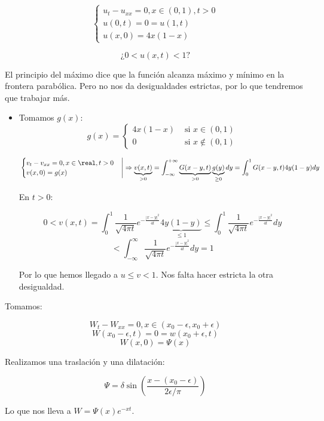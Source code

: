 \begin{problem}[12]

	\[\begin{cases}
		u_t - u_{xx} = 0, x \in (0,1), t > 0\\
		u(0,t) = 0 = u(1,t)\\
		u(x,0) = 4x(1-x)
	\end{cases}\]

	\[\text{¿} 0 < u(x,t) < 1 \text{?}\]

\solution

	El principio del máximo dice que la función alcanza máximo y mínimo en la frontera parabólica. Pero no nos da desigualdades estrictas, por lo que tendremos que trabajar más.

	\begin{itemize}
		\item Tomamos $g(x)$:
		\[g(x) = \begin{cases}
			4x(1-x) & \text{ si } x \in (0,1) \\
			0 & \text{ si } x \not\in (0,1)
		\end{cases}\]

		\[ \left. \begin{cases} v_t - v_{xx} = 0, x \in \real, t > 0 \\
			v(x,0) = g(x)
		\end{cases} \right| \Rightarrow \underbrace{v(x,t)}_{>0} = \int_{-\infty}^{+\infty} \underbrace{G(x-y,t)}_{>0} \underbrace{g(y)}_{\geq 0} dy = \int_0^1 G(x-y,t) 4y(1-y) dy \]

		En $t > 0$:

			\[ 0 < v(x,t) = \int_0^1  \frac{1}{\sqrt{4\pi t}} e^{-\frac{|x-y|^2}{4t}} \underbrace{4y(1-y)}_{\leq 1} \leq \int_0^1 \frac{1}{\sqrt{4\pi t}} e^{-\frac{|x-y|^2}{4t}} dy \]
			\[ < \int_{-\infty}^{\infty}  \frac{1}{\sqrt{4\pi t}} e^{-\frac{|x-y|^2}{4t}} dy = 1 \]

			Por lo que hemos llegado a $u \leq v < 1$. Nos falta hacer estricta la otra desigualdad.
	\end{itemize}

	Tomamos:

	\[W_t - W_{xx} = 0, x \in (x_0 - \epsilon, x_0 + \epsilon)\]
	\[W(x_0-\epsilon,t) = 0 = w(x_0+\epsilon, t)\]
	\[W(x,0) = \Psi(x)\]

	Realizamos una traslación y una dilatación:

	\[ \Psi = \delta \sin(\frac{x- (x_0 - \epsilon)}{2\epsilon/\pi}) \]

	Lo que nos lleva a $W = \Psi(x) e^{-xt}$.

\end{problem}

